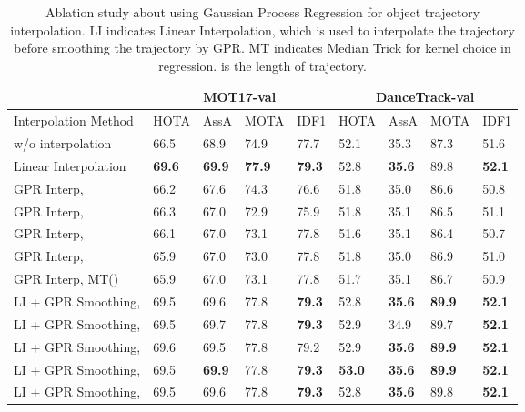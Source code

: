 \documentclass[10pt,twocolumn,letterpaper]{article}
\begin{document}
\begin{table*}[t]
\centering
\caption{Ablation study about using Gaussian Process Regression for object trajectory interpolation. LI indicates Linear Interpolation, which is used to interpolate the trajectory before smoothing the trajectory by GPR. MT indicates Median Trick for kernel choice in regression.  is the length of trajectory.}
\setlength{\tabcolsep}{7pt}
\scriptsize
\begin{tabular}{ l | p{17px}p{17px}p{17px}p{17px}  | p{17px}p{17px}p{17px}p{17px}}
\toprule
& \multicolumn{4}{c|}{MOT17-val} & \multicolumn{4}{c}{DanceTrack-val}\\ 
\midrule
Interpolation Method & HOTA &  AssA & MOTA & IDF1 & HOTA &  AssA & MOTA & IDF1\\ 
\midrule
w/o interpolation & 66.5 & 68.9 & 74.9 & 77.7
& 52.1 & 35.3 & 87.3 & 51.6 \\
Linear Interpolation & \textbf{69.6}  &  \textbf{69.9} & \textbf{77.9} & \textbf{\textbf{79.3}} 
& 52.8 & \textbf{35.6} & 89.8 & \textbf{52.1} \\

\midrule
GPR Interp,  & 66.2 & 67.6 & 74.3 & 76.6 & 51.8 & 35.0 & 86.6 & 50.8\\
GPR Interp,  & 66.3 & 67.0 & 72.9 & 75.9 & 51.8 & 35.1 & 86.5 &  51.1\\
GPR Interp,  & 66.1 & 67.0 & 73.1 & 77.8 & 51.6 & 35.1 & 86.4 & 50.7\\
GPR Interp,  & 65.9 & 67.0 & 73.0 & 77.8 & 51.8 & 35.0 & 86.9  & 51.0\\
GPR Interp,  MT() & 65.9 & 67.0 & 73.1 & 77.8 & 51.7 & 35.1 & 86.7 & 50.9\\
\midrule
LI + GPR Smoothing,  & 69.5 & 69.6 & 77.8 & \textbf{79.3}& 52.8 &\textbf{35.6} & \textbf{89.9} &  \textbf{52.1} \\
LI + GPR Smoothing,  & 69.5 & 69.7 & 77.8 & \textbf{79.3}& 52.9 & 34.9 & 89.7 &  \textbf{52.1} \\
LI + GPR Smoothing,  & 69.6 & 69.5 & 77.8 & 79.2 & 52.9 &\textbf{35.6} & \textbf{89.9} &  \textbf{52.1} \\
LI + GPR Smoothing,  & 69.5 & \textbf{69.9} & 77.8 & \textbf{79.3} & \textbf{53.0} &\textbf{35.6} & \textbf{89.9} &  \textbf{52.1} \\
LI + GPR Smoothing,  & 69.5 & 69.6 & 77.8 & \textbf{79.3}&  52.8 &\textbf{35.6} & 89.8 &  \textbf{52.1} \\
\bottomrule
\end{tabular}
\label{table:gp_interpolation}
\end{table*}
\end{document}
